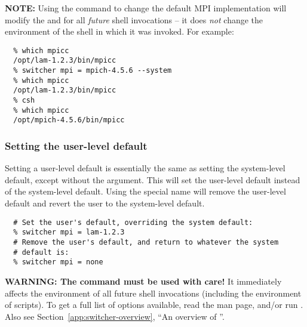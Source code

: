 {\bf NOTE:} Using the  command to change the default MPI
implementation will modify the  and  for all
{\em future} shell invocations -- it does {\em not} change the
environment of the shell in which it was invoked.  For example:

\begin{verbatim}
  % which mpicc
  /opt/lam-1.2.3/bin/mpicc
  % switcher mpi = mpich-4.5.6 --system
  % which mpicc
  /opt/lam-1.2.3/bin/mpicc
  % csh
  % which mpicc
  /opt/mpich-4.5.6/bin/mpicc
\end{verbatim}

\subsubsection{Setting the user-level default}

Setting a user-level default is essentially the same as setting the
system-level default, except without the  argument.
This will set the user-level default instead of the system-level
default.  Using the special name  will remove the user-level
default and revert the user to the system-level default.

\begin{verbatim}
  # Set the user's default, overriding the system default:
  % switcher mpi = lam-1.2.3
  # Remove the user's default, and return to whatever the system
  # default is:
  % switcher mpi = none
\end{verbatim}

{\bf WARNING: The  command must be used with care!}  It
immediately affects the environment of all future shell invocations
(including the environment of scripts).  To get a full list of options
available, read the  man page, and/or run
.  Also see Section~\ref{app:switcher-overview},
``An overview of ''.
